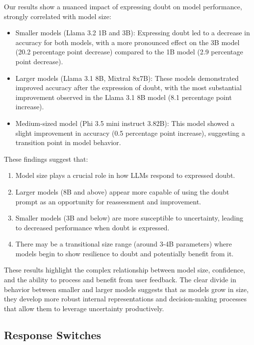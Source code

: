 Our results show a nuanced impact of expressing doubt on model performance, strongly correlated with model size:

\begin{itemize}
  \item Smaller models (Llama 3.2 1B and 3B): Expressing doubt led to a decrease in accuracy for both models, with a more pronounced effect on the 3B model (20.2 percentage point decrease) compared to the 1B model (2.9 percentage point decrease).

  \item Larger models (Llama 3.1 8B, Mixtral 8x7B): These models demonstrated improved accuracy after the expression of doubt, with the most substantial improvement observed in the Llama 3.1 8B model (8.1 percentage point increase).

  \item Medium-sized model (Phi 3.5 mini instruct 3.82B): This model showed a slight improvement in accuracy (0.5 percentage point increase), suggesting a transition point in model behavior.
\end{itemize}

These findings suggest that:

\begin{enumerate}
  \item Model size plays a crucial role in how LLMs respond to expressed doubt.
  \item Larger models (8B and above) appear more capable of using the doubt prompt as an opportunity for reassessment and improvement.
  \item Smaller models (3B and below) are more susceptible to uncertainty, leading to decreased performance when doubt is expressed.
  \item There may be a transitional size range (around 3-4B parameters) where models begin to show resilience to doubt and potentially benefit from it.
\end{enumerate}

These results highlight the complex relationship between model size, confidence, and the ability to process and benefit from user feedback. The clear divide in behavior between smaller and larger models suggests that as models grow in size, they develop more robust internal representations and decision-making processes that allow them to leverage uncertainty productively.

\subsection{Response Switches}

